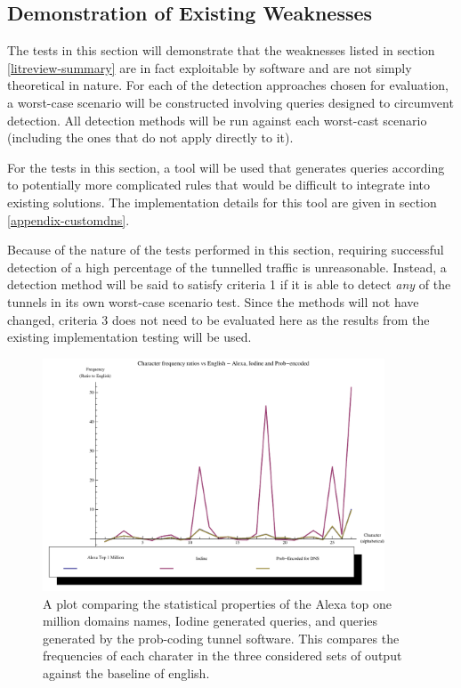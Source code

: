 \documentclass[12pt]{report}
\theoremstyle{remark}
\theoremstyle{definition}
\theoremstyle{definition}
\theoremstyle{definition}
\begin{document}
\subsection{Demonstration of Existing Weaknesses}
\label{test-weakness}
The tests
in this section will demonstrate that the weaknesses listed in section
\ref{litreview-summary} are in fact exploitable by software and are not simply
theoretical in nature. For each of the detection approaches chosen for
evaluation, a worst-case scenario will be constructed involving queries designed
to circumvent detection. All detection methods will be run against each
worst-cast scenario (including the ones that do not apply directly to it).

For the tests in this section, a tool will be used that generates queries
according to potentially more complicated rules that would be difficult to
integrate into existing solutions. The implementation details for this tool are
given in section \ref{appendix-customdns}.

Because of the nature of the tests performed in this section, requiring
successful detection of a high percentage of the tunnelled traffic is
unreasonable. Instead, a detection method will be said to satisfy criteria 1 if
it is able to detect \emph{any} of the tunnels in its own worst-case scenario
test. Since the methods will not have changed, criteria 3 does not need to be
evaluated here as the results from the existing implementation testing will be
used.




\begin{figure}
\centering
\includegraphics[width=4in]{figures/alexa_iodine_prob_v_english-r.pdf}
\caption[DNS Query, Iodine and Prob-coded Comparison - Ratio]{A plot comparing the statistical properties of the Alexa top one million domains names, Iodine generated queries, and queries generated by the prob-coding tunnel software. This compares the frequencies of each charater in the three considered sets of output against the baseline of english.}
\label{FIGURE_alexa-iodine-prob-v-english-r}
\end{figure}
\end{document}
